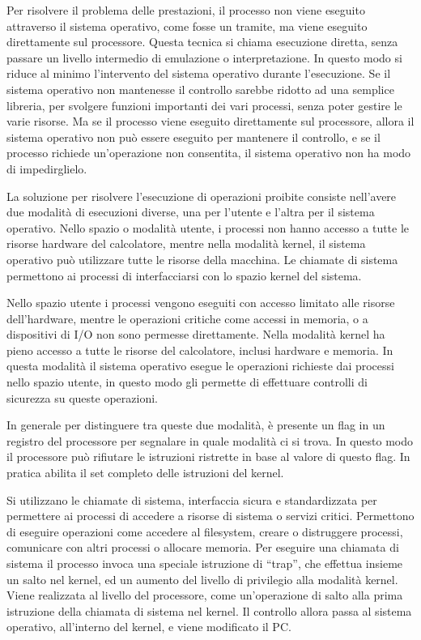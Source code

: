 \documentclass{article}
\numberwithin{equation}{subsection}
\begin{document}
Per risolvere il problema delle prestazioni, il processo non viene eseguito attraverso il sistema operativo, come fosse un tramite, ma viene eseguito direttamente 
sul processore. Questa tecnica si chiama esecuzione diretta, senza passare un livello intermedio di emulazione o interpretazione. In questo modo si riduce al minimo 
l'intervento del sistema operativo durante l'esecuzione. 
Se il sistema operativo non mantenesse il controllo sarebbe ridotto ad una semplice libreria, per svolgere funzioni importanti dei vari processi, senza poter gestire 
le varie risorse. 
Ma se il processo viene eseguito direttamente sul processore, allora il sistema operativo non può essere eseguito per mantenere il controllo, e se il processo 
richiede un'operazione non consentita, il sistema operativo non ha modo di impedirglielo. 

La soluzione per risolvere l'esecuzione di operazioni proibite consiste nell'avere due modalità di esecuzioni diverse, una per l'utente e l'altra per il sistema operativo. 
Nello spazio o modalità utente, i processi non hanno accesso a tutte le risorse hardware del calcolatore, mentre nella modalità kernel, il sistema operativo 
può utilizzare tutte le risorse della macchina. Le chiamate di sistema permettono ai processi di interfacciarsi con lo spazio kernel del sistema. 

Nello spazio utente i processi vengono eseguiti con accesso limitato alle risorse dell'hardware, mentre le operazioni critiche come accessi in memoria, o a dispositivi 
di I/O non sono permesse direttamente. 
Nella modalità kernel ha pieno accesso a tutte le risorse del calcolatore, inclusi hardware e memoria. In questa modalità il sistema operativo esegue le operazioni 
richieste dai processi nello spazio utente, in questo modo gli permette di effettuare controlli di sicurezza su queste operazioni. 


In generale per distinguere tra queste due modalità, è presente un flag in un registro del processore per segnalare in quale modalità ci si trova. In questo modo il 
processore può rifiutare le istruzioni ristrette in base al valore di questo flag. In pratica abilita il set completo delle istruzioni del kernel. 

Si utilizzano le chiamate di sistema, interfaccia sicura e standardizzata per permettere ai processi di accedere a risorse di sistema o servizi critici. Permettono di 
eseguire operazioni come accedere al filesystem, creare o distruggere processi, comunicare con altri processi o allocare memoria. Per eseguire una chiamata di sistema 
il processo invoca una speciale istruzione di ``trap'', che effettua insieme un salto nel kernel, ed un aumento del livello di privilegio alla modalità kernel. 
Viene realizzata al livello del processore, come un'operazione di salto alla prima istruzione della chiamata di sistema nel kernel. 
Il controllo allora passa al sistema operativo, all'interno del kernel, e viene modificato il PC. 
\end{document}
